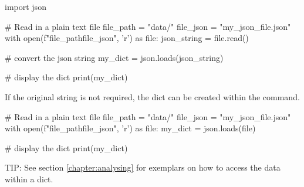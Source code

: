 \begin{pycode}
    import json

    # Read in a plain text file
    file_path = "data/"
    file_json = "my_json_file.json"
    with open(f"{file_path}{file_json}", 'r') as file:
    json_string = file.read()

    # convert the json string
    my_dict = json.loads(json_string)

    # display the dict
    print(my_dict)
\end{pycode}

If the original string is not required, the dict can be created within the  command.

\begin{pycode}
    # Read in a plain text file
    file_path = "data/"
    file_json = "my_json_file.json"
    with open(f"{file_path}{file_json}", 'r') as file:
    my_dict = json.loads(file)

    # display the dict
    print(my_dict)
\end{pycode}

TIP: See section \ref{chapter:analysing} for exemplars on how to access the data within a dict.

